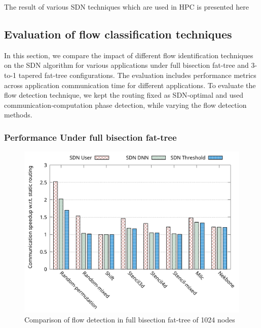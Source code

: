 The result of various SDN techniques which are used in HPC is presented here

\subsection{Evaluation of flow classification techniques}

In this section, we compare the impact of different flow identification techniques on the SDN algorithm for various applications under full bisection fat-tree and 3-to-1 tapered fat-tree configurations. The evaluation includes performance metrics across application communication time for different applications. To evaluate the flow detection technique, we kept the routing fixed as SDN‑optimal and used communication‑computation phase detection, while varying the flow detection methods.

\subsubsection{Performance Under full bisection fat-tree}
\begin{figure}[h]
  \centering
  \includegraphics[width=\columnwidth]{./figs_4/full_fat_flow_detection.pdf}
  \caption{Comparison of flow detection in full bisection fat-tree of 1024 nodes}
  \label{fig:fld_full}
\end{figure}

